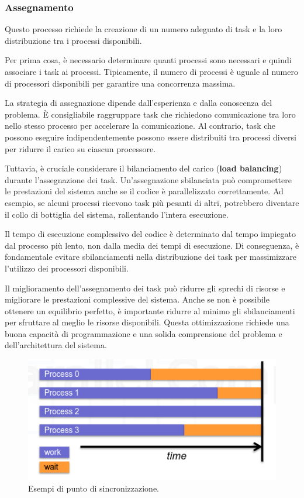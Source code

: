 \subsubsection{Assegnamento}
Questo processo richiede la creazione di un numero adeguato di task e la loro distribuzione tra i processi disponibili.

Per prima cosa, è necessario determinare quanti processi sono necessari e quindi associare i task ai processi. Tipicamente, il numero di processi è uguale al numero di processori disponibili per garantire una concorrenza massima.

La strategia di assegnazione dipende dall'esperienza e dalla conoscenza del problema. È consigliabile raggruppare task che richiedono comunicazione tra loro nello stesso processo per accelerare la comunicazione. Al contrario, task che possono eseguire indipendentemente possono essere distribuiti tra processi diversi per ridurre il carico su ciascun processore.

Tuttavia, è cruciale considerare il bilanciamento del carico (\textbf{load balancing}) durante l'assegnazione dei task. Un'assegnazione sbilanciata può compromettere le prestazioni del sistema anche se il codice è parallelizzato correttamente. Ad esempio, se alcuni processi ricevono task più pesanti di altri, potrebbero diventare il collo di bottiglia del sistema, rallentando l'intera esecuzione.

Il tempo di esecuzione complessivo del codice è determinato dal tempo impiegato dal processo più lento, non dalla media dei tempi di esecuzione. Di conseguenza, è fondamentale evitare sbilanciamenti nella distribuzione dei task per massimizzare l'utilizzo dei processori disponibili.

Il miglioramento dell'assegnamento dei task può ridurre gli sprechi di risorse e migliorare le prestazioni complessive del sistema. Anche se non è possibile ottenere un equilibrio perfetto, è importante ridurre al minimo gli sbilanciamenti per sfruttare al meglio le risorse disponibili. Questa ottimizzazione richiede una buona capacità di programmazione e una solida comprensione del problema e dell'architettura del sistema.


\begin{figure}[th]
	\centering
	\includegraphics[width=0.7\linewidth]{img/barrier-sync.png}
	\caption{Esempi di punto di sincronizzazione.}
	\label{fig:barrier-sync}
\end{figure}

